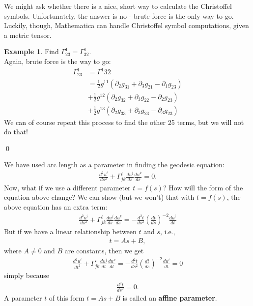 \documentclass{book}
\theoremstyle{definition}
\newtheorem{exmp}{Example}[section]
\begin{document}
We might ask whether there is a nice, short way to calculate the Christoffel symbols. Unfortunately, the answer is no - brute force is the only way to go. Luckily, though, Mathematica can handle Christoffel symbol computations, given a metric tensor. 
\begin{exmp}
	Find $\Gamma^{1}_{23} = \Gamma^1_{32}$.\\
	
	Again, brute force is the way to go:
	\begin{align*}
	\Gamma^{1}_{23} &= \Gamma^1{32}\\
	&= \frac{1}{2}g^{11}\left( \partial_2 g_{31} + \partial_3 g_{21} - \partial_1 g_{23}\right)\\
	&+ \frac{1}{2}g^{12}\left( \partial_2 g_{32} + \partial_3 g_{22} - \partial_2 g_{23}\right)\\
	&+
	\frac{1}{2}g^{13}\left( \partial_2 g_{33} + \partial_3 g_{23} - \partial_3 g_{23}\right)
	\end{align*}
	We can of course repeat this process to find the other 25 terms, but we will not do that!
\end{exmp}\qed

We have used arc length as a parameter in finding the geodesic equation:
\begin{align*}
\frac{d^2u^i}{ds^2} + \Gamma^{i}_{jk}\frac{du^j}{ds}\frac{du^k}{ds} = 0.
\end{align*}
Now, what if we use a different parameter $t = f(s)$? How will the form of the equation above change? We can show (but we won't) that with $t = f(s)$, the above equation has an extra term:
\begin{align*}
\boxed{\frac{d^2u^i}{ds^2} + \Gamma^{i}_{jk}\frac{du^j}{ds}\frac{du^k}{ds} = -\frac{d^2t}{ds^2}\left( \frac{dt}{ds}\right)^{-2}\frac{du^i}{dt}}
\end{align*}
But if we have a linear relationship between $t$ and $s$, i.e.,
\begin{align*}
t = As +B,
\end{align*}
where $A\neq 0$ and $B$ are constants, then we get
\begin{align*}
\boxed{\frac{d^2u^i}{dt^2} + \Gamma^{i}_{jk}\frac{du^j}{dt}\frac{du^k}{dt} = -\frac{d^2t}{ds^2}\left( \frac{dt}{ds}\right)^{-2}\frac{du^i}{dt} = 0}
\end{align*}
simply because
\begin{align*}
\frac{d^2t}{ds^2} = 0.
\end{align*}
A parameter $t$ of this form $t = As + B$ is called an \textbf{affine parameter}. 
\end{document}
